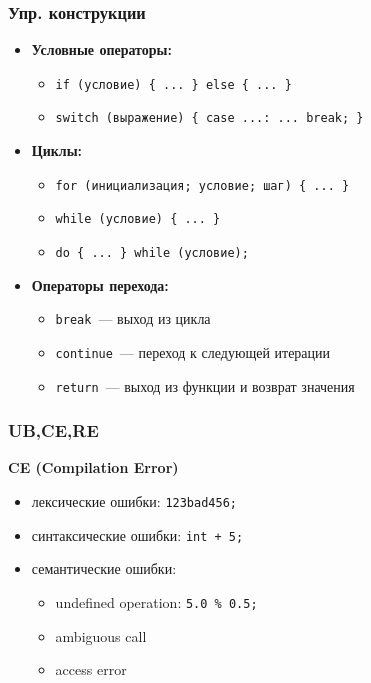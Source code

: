 \subsubsection{Упр. конструкции}
\begin{itemize}
  \item \textbf{Условные операторы:}
    \begin{itemize}
      \item \verb|if (условие) { ... } else { ... }|
      \item \verb|switch (выражение) { case ...: ... break; }|
    \end{itemize}

  \item \textbf{Циклы:}
    \begin{itemize}
      \item \verb|for (инициализация; условие; шаг) { ... }|
      \item \verb|while (условие) { ... }|
      \item \verb|do { ... } while (условие);|
    \end{itemize}

  \item \textbf{Операторы перехода:}
    \begin{itemize}
      \item \verb|break|~--- выход из цикла
      \item \verb|continue|~--- переход к следующей итерации
      \item \verb|return|~--- выход из функции и возврат значения
    \end{itemize}
\end{itemize}
\subsubsection{UB,CE,RE}
\textbf{CE (Compilation Error)}
\begin{itemize}
    \item лексические ошибки: \texttt{123bad456;}
    \item синтаксические ошибки: \texttt{int + 5;}
    \item семантические ошибки:
    \begin{itemize}
        \item undefined operation: \texttt{5.0 \% 0.5;}
        \item ambiguous call
        \item access error
    \end{itemize}
\end{itemize}

